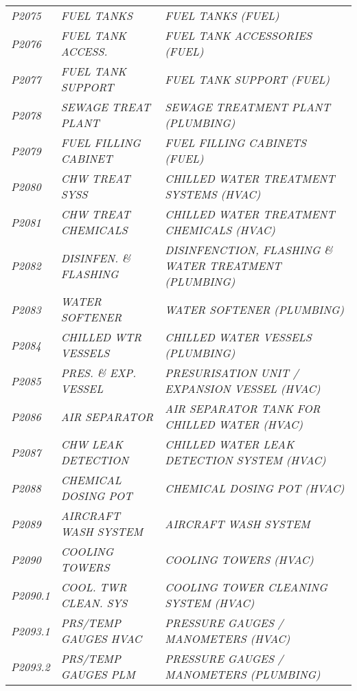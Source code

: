 \begin{landscape}
\begin{longtable}[l]{l%
                  l|%
                  l|}
\itshape P2075       &\itshape FUEL TANKS   &\itshape FUEL TANKS (FUEL)   \\
\itshape P2076       &\itshape FUEL TANK ACCESS.   &\itshape FUEL TANK ACCESSORIES (FUEL)   \\
\itshape P2077       &\itshape FUEL TANK SUPPORT   &\itshape FUEL TANK SUPPORT (FUEL)   \\
\itshape P2078       &\itshape SEWAGE TREAT PLANT   &\itshape SEWAGE TREATMENT PLANT (PLUMBING)   \\
\itshape P2079       &\itshape FUEL FILLING CABINET   &\itshape FUEL FILLING CABINETS (FUEL)   \\
\itshape P2080       &\itshape CHW TREAT SYSS   &\itshape CHILLED WATER TREATMENT SYSTEMS (HVAC)   \\
\itshape P2081       &\itshape CHW TREAT CHEMICALS   &\itshape CHILLED WATER TREATMENT CHEMICALS (HVAC)   \\
\itshape P2082       &\itshape DISINFEN. \& FLASHING   &\itshape DISINFENCTION, FLASHING \& WATER TREATMENT (PLUMBING)   \\
\itshape P2083       &\itshape WATER SOFTENER   &\itshape WATER SOFTENER (PLUMBING)   \\
\itshape P2084       &\itshape CHILLED WTR VESSELS   &\itshape CHILLED WATER VESSELS (PLUMBING)   \\
\itshape P2085       &\itshape PRES. \& EXP. VESSEL   &\itshape PRESURISATION UNIT / EXPANSION VESSEL (HVAC)   \\
\itshape P2086       &\itshape AIR SEPARATOR   &\itshape AIR SEPARATOR TANK FOR CHILLED WATER (HVAC)   \\
\itshape P2087       &\itshape CHW LEAK DETECTION   &\itshape CHILLED WATER LEAK DETECTION SYSTEM (HVAC)   \\
\itshape P2088       &\itshape CHEMICAL DOSING POT   &\itshape CHEMICAL DOSING POT (HVAC)   \\
\itshape P2089       &\itshape AIRCRAFT WASH SYSTEM   &\itshape AIRCRAFT WASH SYSTEM   \\
\itshape P2090       &\itshape COOLING TOWERS   &\itshape COOLING TOWERS (HVAC)   \\
\itshape P2090.1     &\itshape COOL. TWR CLEAN. SYS   &\itshape COOLING TOWER CLEANING SYSTEM (HVAC)   \\
\itshape P2093.1     &\itshape PRS/TEMP GAUGES HVAC   &\itshape PRESSURE GAUGES / MANOMETERS (HVAC)   \\
\itshape P2093.2     &\itshape PRS/TEMP GAUGES PLM    &\itshape PRESSURE GAUGES / MANOMETERS (PLUMBING)   \\

\end{longtable}
\end{landscape}
